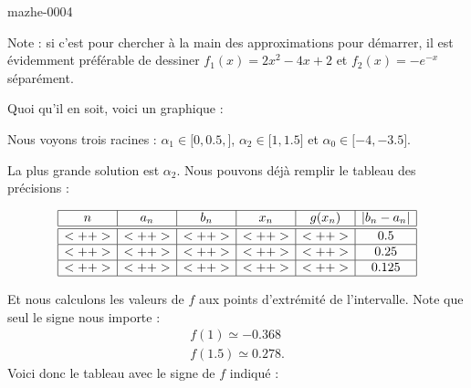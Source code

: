 
\begin{corrige}{mazhe-0004}

    Note : si c'est pour chercher à la main des approximations pour démarrer, il est évidemment préférable de dessiner \( f_1(x)=2x^2-4x+2\) et \( f_2(x)=- e^{-x}\) séparément.

    Quoi qu'il en soit, voici un graphique :

\begin{center}
   
\end{center}

    Nous voyons trois racines : \( \alpha_1\in\mathopen[ 0,0.5 ,  \mathclose]\), \( \alpha_2\in\mathopen[ 1, 1.5 \mathclose]\) et \( \alpha_0\in\mathopen[ -4 , -3.5 \mathclose]\).

    La plus grande solution est \( \alpha_2\). Nous pouvons déjà remplir le tableau des précisions :

    \begin{equation*}
        \begin{array}[]{|c|c|c|c|c|c|}
            \hline
            n&a_n&b_n&x_n&g(x_n)&| b_n-a_n |\\
            \hline\hline
            <++>&<++>&<++>&<++>&<++>&0.5\\
            \hline
            <++>&<++>&<++>&<++>&<++>&0.25\\
            \hline
            <++>&<++>&<++>&<++>&<++>&0.125\\
            \hline
        \end{array}
    \end{equation*}

    Et nous calculons les valeurs de \( f\) aux points d'extrémité de l'intervalle. Note que seul le signe nous importe :
    \begin{subequations}
        \begin{align}
            f(1)\simeq -0.368\\
            f(1.5)\simeq 0.278.
        \end{align}
    \end{subequations}
    Voici donc le tableau avec le signe de \( f\) indiqué :


\end{corrige}
